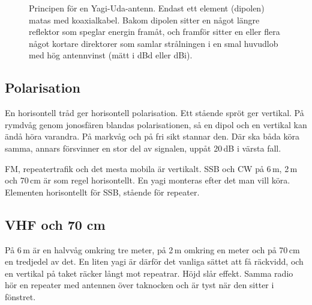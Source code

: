 \begin{figure}[H]
\caption{Principen för en Yagi-Uda-antenn. Endast ett element (dipolen) matas
med koaxialkabel. Bakom dipolen sitter en något längre reflektor som speglar
energin framåt, och framför sitter en eller flera något kortare direktorer som
samlar strålningen i en smal huvudlob med hög antennvinst (mätt i dBd eller dBi).}
\label{fig:yagi}
\end{figure}

\subsection{Polarisation}

En horisontell tråd ger horisontell polarisation. Ett stående spröt
ger vertikal. På rymdvåg genom jonosfären blandas polarisationen, så
en dipol och en vertikal kan ändå höra varandra. På markvåg och på fri
sikt stannar den. Där ska båda köra samma, annars försvinner en stor
del av signalen, uppåt 20\,dB i värsta fall.

FM, repeatertrafik och det mesta mobila är vertikalt. SSB och CW på
6\,m, 2\,m och 70\,cm är som regel horisontellt. En yagi monteras
efter det man vill köra. Elementen horisontellt för SSB, stående för
repeater.

\subsection{VHF och 70 cm}
\label{sec:vhf-antenn}
\index{70 cm}

På 6\,m är en halvvåg omkring tre meter, på 2\,m omkring en meter och
på 70\,cm en tredjedel av det. En liten yagi är därför det vanliga
sättet att få räckvidd, och en vertikal på taket räcker långt mot
repeatrar. Höjd slår effekt. Samma radio hör en repeater med antennen
över taknocken och är tyst när den sitter i fönstret.

